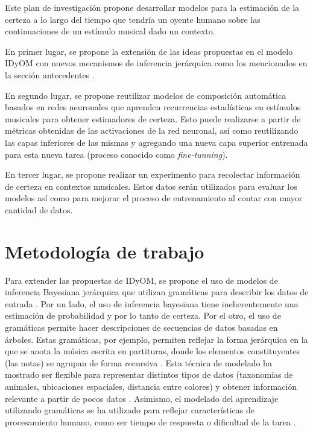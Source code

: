 \documentclass[a4paper,11pt]{article}
\begin{document}
Este plan de investigación propone desarrollar modelos para la estimación de la
certeza a lo largo del tiempo que tendría un oyente humano sobre las
continuaciones de un estímulo musical dado un contexto.

En primer lugar, se propone la extensión de las ideas propuestas en el
modelo IDyOM \cite{pearce2005construction} con nuevos mecanismos de inferencia
jerárquica como los mencionados en la sección antecedentes
\cite{dehaene2015neural}. 

En segundo lugar, se propone reutilizar modelos de composición automática
basados en redes neuronales que aprenden recurrencias estadísticas en estímulos
musicales para obtener estimadores de certeza. Esto puede realizarse a partir
de métricas obtenidas de las activaciones de la red neuronal, así como
reutilizando las capas inferiores de las mismas y agregando una nueva capa
superior entrenada para esta nueva tarea (proceso conocido como
\emph{fine-tunning}).

En tercer lugar, se propone realizar un experimento para recolectar información
de certeza en contextos musicales. Estos datos serán utilizados para evaluar
los modelos así como para mejorar el proceso de entrenamiento al contar con
mayor cantidad de datos.

\section*{Metodología de trabajo}

Para extender las propuestas de IDyOM, se propone el uso de modelos de
inferencia Bayesiana jerárquica que utilizan gramáticas para describir los
datos de entrada \cite{tenenbaum2011grow}. Por un lado, el uso de inferencia
bayesiana tiene ineherentemente una estimación de probabilidad y por lo tanto
de certeza.  Por el otro, el uso de gramáticas permite hacer descripciones de
secuencias de datos basadas en árboles. Estas gramáticas, por ejemplo, permiten
reflejar la forma jerárquica en la que se anota la música escrita en
partituras, donde los elementos constituyentes (las notas) se agrupan de forma
recursiva \cite{fitch2013meter-vs-pulse}.  Esta técnica de modelado ha mostrado
ser flexible para representar distintos tipos de datos (taxonomías de animales,
ubicaciones espaciales, distancia entre colores) y obtener información
relevante a partir de pocos datos \cite{tenenbaum2011grow}. Asimismo, el
modelado del aprendizaje utilizando gramáticas se ha utilizado para reflejar
características de procesamiento humano, como ser tiempo de respuesta o
dificultad de la tarea \cite{tano2018learning}.
\end{document}
